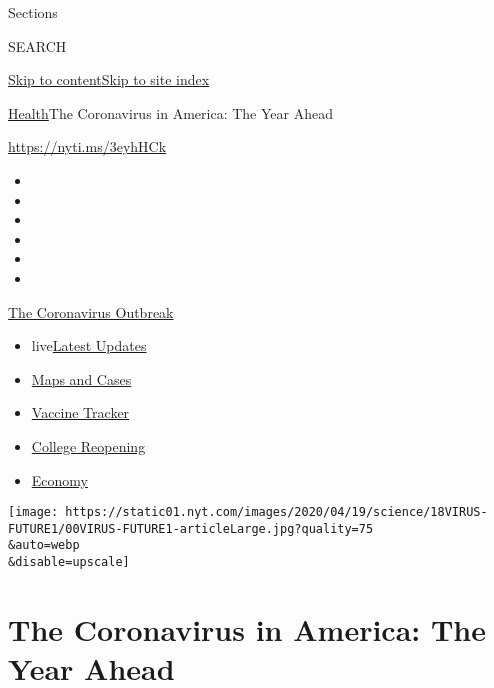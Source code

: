Sections

SEARCH

\protect\hyperlink{site-content}{Skip to
content}\protect\hyperlink{site-index}{Skip to site index}

\href{/section/health}{Health}\textbar{}The Coronavirus in America: The
Year Ahead

\url{https://nyti.ms/3eyhHCk}

\begin{itemize}
\item
\item
\item
\item
\item
\item
\end{itemize}

\href{https://www.nytimes.com/news-event/coronavirus?action=click\&pgtype=Article\&state=default\&region=TOP_BANNER\&context=storylines_menu}{The
Coronavirus Outbreak}

\begin{itemize}
\tightlist
\item
  live\href{https://www.nytimes.com/2020/08/04/world/coronavirus-cases.html?action=click\&pgtype=Article\&state=default\&region=TOP_BANNER\&context=storylines_menu}{Latest
  Updates}
\item
  \href{https://www.nytimes.com/interactive/2020/us/coronavirus-us-cases.html?action=click\&pgtype=Article\&state=default\&region=TOP_BANNER\&context=storylines_menu}{Maps
  and Cases}
\item
  \href{https://www.nytimes.com/interactive/2020/science/coronavirus-vaccine-tracker.html?action=click\&pgtype=Article\&state=default\&region=TOP_BANNER\&context=storylines_menu}{Vaccine
  Tracker}
\item
  \href{https://www.nytimes.com/2020/08/02/us/covid-college-reopening.html?action=click\&pgtype=Article\&state=default\&region=TOP_BANNER\&context=storylines_menu}{College
  Reopening}
\item
  \href{https://www.nytimes.com/live/2020/08/04/business/stock-market-today-coronavirus?action=click\&pgtype=Article\&state=default\&region=TOP_BANNER\&context=storylines_menu}{Economy}
\end{itemize}

\texttt{[image: https://static01.nyt.com/images/2020/04/19/science/18VIRUS-FUTURE1/00VIRUS-FUTURE1-articleLarge.jpg?quality=75\\\&auto=webp\\\&disable=upscale]}

\hypertarget{the-coronavirus-in-america-the-year-ahead}{%
\section{The Coronavirus in America: The Year
Ahead}\label{the-coronavirus-in-america-the-year-ahead}}

